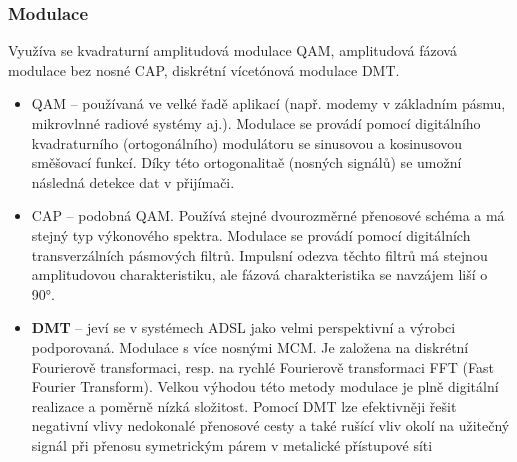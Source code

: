 \subsubsection{Modulace}
Využíva se kvadraturní amplitudová modulace QAM, amplitudová fázová modulace bez nosné CAP, diskrétní vícetónová modulace DMT.
\begin{itemize}
    \item QAM -- používaná ve velké řadě aplikací (např. modemy v základním pásmu, mikrovlnné radiové systémy aj.). Modulace se provádí pomocí digitálního kvadraturního (ortogonálního) modulátoru se sinusovou a kosinusovou směšovací funkcí. Díky této ortogonalitaě (nosných signálů) se umožní následná detekce dat v přijímači.
    \item CAP -- podobná QAM. Používá stejné dvourozměrné přenosové schéma a má stejný typ výkonového spektra. Modulace se provádí pomocí digitálních transverzálních pásmových filtrů. Impulsní odezva těchto filtrů má stejnou amplitudovou charakteristiku, ale fázová charakteristika se navzájem liší o 90°.
    \item \textbf{DMT} -- jeví se v systémech ADSL jako velmi perspektivní a výrobci podporovaná. Modulace s více nosnými MCM. Je založena na diskrétní Fourierově transformaci, resp. na rychlé Fourierově transformaci FFT (Fast Fourier Transform). Velkou výhodou této metody modulace je plně digitální realizace a poměrně nízká složitost. Pomocí DMT lze efektivněji řešit negativní vlivy nedokonalé přenosové cesty a také rušící vliv okolí na užitečný signál při přenosu symetrickým párem v metalické přístupové síti
\end{itemize}
\newpage

